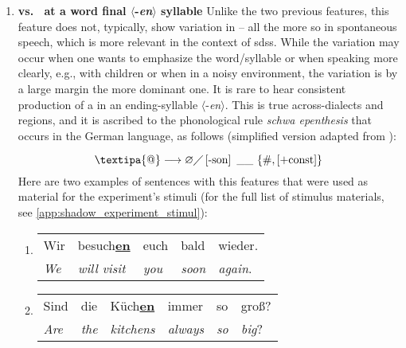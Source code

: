 \begin{enumerate}
	\item \textbf{\textipa{[@n]} vs.\ \textipa{[\s{n}]} at a word final $\langle$-\textit{en}$\rangle$ syllable}
	Unlike the two previous features, this feature does not, typically, show variation in -- all the more so in spontaneous speech, which is more relevant in the context of \acp{sds}.
	While the \textipa{[@n]} variation may occur when one wants to emphasize the word/syllable or when speaking more clearly, e.g., with children or when in a noisy environment, the \textipa{[\s{n}]} variation is by a large margin the more dominant one.
	It is rare to hear consistent production of a \textipa{[@n]} in an ending-syllable $\langle$-\textit{en}$\rangle$.
	This is true across-dialects and regions, and it is ascribed to the phonological rule \textit{schwa epenthesis} that occurs in the German language, as follows (simplified version adapted from \citet[pp.\,142--143]{Benware1986phonetics}):
	
	\begin{equation}
		\text{\textipa{@}} \longrightarrow \varnothing \diagup
		\left[\text{-son}\right] \ \_\_ \ \{\text{\#}, \left[\text{+const}\right]\}
		\label{eq:schwa_elision_rule}
	\end{equation}
	Here are two examples of sentences with this features that were used as material for the experiment's stimuli (for the full list of stimulus materials, see \autoref{app:shadow_experiment_stimul}):
	
	\begin{enumerate}[label=\arabic{enumi}\alph*), ref=\arabic{enumi}\alph*.)]
		\item 
		\begin{tabulary}{\linewidth}{LLLLL}
			Wir & besuch\textbf{\underline{en}} & euch & bald & wieder.\\
			\textit{We} & \textit{will visit} & \textit{you} & \textit{soon} & \textit{again}.\\
		\end{tabulary}
		\item
		\begin{tabulary}{\linewidth}{LLLLLL}
			Sind & die & Küch\textbf{\underline{en}} & immer & so & groß?\\
			\textit{Are} & \textit{the} & \textit{kitchens} & \textit{always} & \textit{so} & \textit{big}?\\
		\end{tabulary}
	\end{enumerate}
\end{enumerate}



